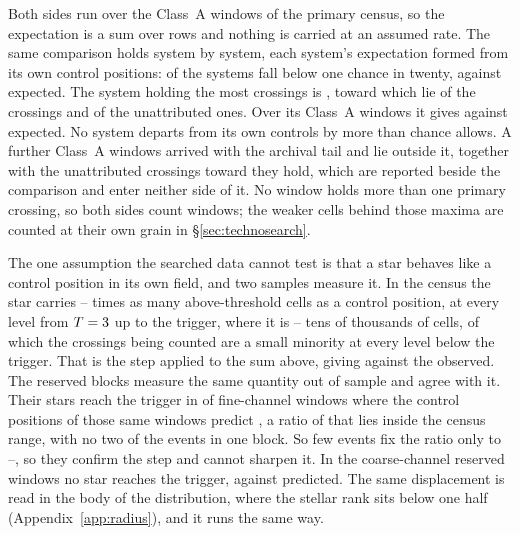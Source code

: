 Both sides run over the \CeNWin{} Class~A windows of the primary census, so
the expectation is a sum over rows and nothing is carried at an assumed rate.
The same comparison holds system by system, each system's expectation formed
from its own control positions: \MtNSysLowP{} of the \MtNSysChance{} systems
fall below one chance in twenty, against \MtNSysLowPExp{} expected. The system
holding the most crossings is \MtTopStar, toward which lie
\MtTopStarNCross{} of the \EvNCrossRaw{} crossings and \MtTopStarNUnattr{} of
the unattributed ones. Over its \MtTopSysNWin{} Class~A windows it gives
\MtTopSysObs{} against \MtTopSysExp{} expected. No system departs from its
own controls by more than chance allows.
A further \CeNWinTail{} Class~A windows arrived with the archival tail and lie
outside it, together with the \CeNTailCrossWord{} unattributed crossings
toward \CeTailStar{} they hold, which are reported beside the comparison and
enter neither side of it. No window holds more than one primary crossing, so
both sides count windows; the weaker cells behind those maxima are counted at
their own grain in \S\ref{sec:technosearch}.

The one assumption the searched data cannot test is that a star behaves like
a control position in its own field, and two samples measure it. In the census
the star carries \CkRatioLo--\CkRatioHi{} times as many above-threshold cells
as a control position, at every level from $T=3$ up to the trigger,
where it is \CeTrAt{} -- tens of thousands of cells, of which the crossings
being counted are a small minority at every level below the trigger. That is
the step applied to the sum above, giving \CeExpX{} against the \CeObs{}
observed. The reserved blocks
measure the same quantity out of sample and agree with it. Their stars reach
the trigger in \StHoObs{} of \StHoNFine{} fine-channel windows where the
control positions of those same windows predict \StHoExpFine, a ratio of
\StHoRatio{} that lies inside the census range, with no two of the events in
one block. So few events fix the ratio only to \StHoLo--\StHoHi, so they
confirm the step and cannot sharpen it. In the \StHoNCoarse{} coarse-channel
reserved windows no star reaches the trigger, against \StHoExpCoarse{}
predicted. The same displacement is read in the body of the distribution,
where the stellar rank sits below one half (Appendix~\ref{app:radius}), and it
runs the same way.


